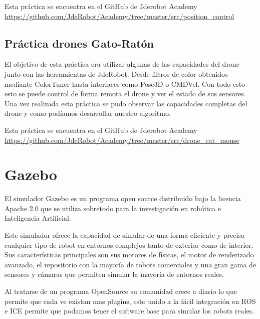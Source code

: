 \hspace{1cm} Esta práctica se encuentra en el GitHub de Jderobot Academy  \url{https://github.com/JdeRobot/Academy/tree/master/src/position_control} 

\subsection{Práctica drones Gato-Ratón}
\hspace{1cm} El objetivo de esta práctica era utilizar algunas de las capacidades del drone junto con las herramientas de JdeRobot. Desde filtros de color obtenidos mediante ColorTuner hasta interfaces como Pose3D o CMDVel. Con todo esto esto se puede control de forma remota el drone y ver el estado de sus sensores. Una vez realizada esta práctica se pudo observar las capacidades completas del drone y como podíamos desarrollar nuestro algoritmo.

\hspace{1cm} Esta práctica se encuentra en el GitHub de Jderobot Academy  \url{https://github.com/JdeRobot/Academy/tree/master/src/drone_cat_mouse} 

\section{Gazebo}
\hspace{1cm} El simulador Gazebo es un programa open source distribuido bajo la licencia Apache 2.0 que se utiliza sobretodo para la investigación en robótica e Inteligencia Artificial.

\hspace{1cm} Este simulador ofrece la capacidad de simular de una forma eficiente y precisa cualquier tipo de robot en entornos complejos tanto de exterior como de interior. Sus características principales son sus motores de físicas, el motor de renderizado avanzado, el repositorio con la mayoría de robots comerciales y una gran gama de sensores y cámaras que permiten simular la mayoría de entornos reales.

\hspace{1cm} Al tratarse de un programa OpenSource su comunidad crece a diario lo que permite que cada ve existan mas plugins, esto unido a la fácil integración en ROS e ICE permite que podamos tener el software base para simular los robots reales.
\\

